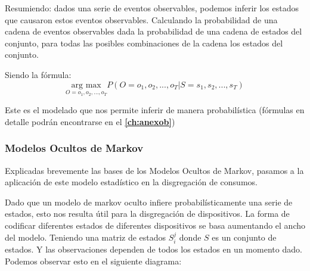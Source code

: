 Resumiendo: dados una serie de eventos observables, podemos inferir los estados que causaron estos eventos observables. Calculando la probabilidad de una cadena de eventos observables dada la probabilidad de una cadena de estados del conjunto, para todas las posibles combinaciones de la cadena los estados del conjunto. 

Siendo la fórmula:
$$
\underset{O=o_1,o_2,...,o_{T}}{\text{arg max}} P (O=o_1,o_2,...,o_{T} | S=s_1,s_2,...,s_{T})
$$

Este es el modelado que nos permite inferir de manera probabilística (fórmulas en detalle podrán encontrarse en el \textbf{\autoref{ch:anexob}})

\subsubsection{Modelos Ocultos de Markov}
Explicadas brevemente las bases de los Modelos Ocultos de Markov, pasamos a la aplicación de este modelo estadístico en la disgregación de consumos.

Dado que un modelo de markov oculto infiere probabilísticamente una serie de estados, esto nos resulta útil para la disgregación de dispositivos. La forma de codificar diferentes estados de diferentes dispositivos se basa aumentando el ancho del modelo. Teniendo una matriz de estados $S_i^j$ donde $S$ es un conjunto de estados. Y las observaciones dependen de todos los estados en un momento dado. Podemos observar esto en el siguiente diagrama:

\begin{center}
\end{center}

